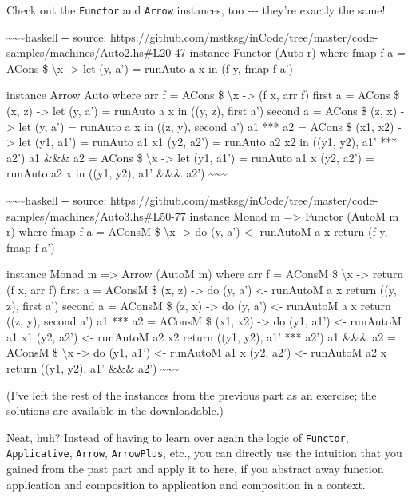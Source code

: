 \documentclass[]{article}
\begin{document}
Check out the \texttt{Functor} and \texttt{Arrow} instances, too -\/-\/- they're
exactly the same!

\textasciitilde{}\textasciitilde{}\textasciitilde{}haskell -\/- source:
https://github.com/mstksg/inCode/tree/master/code-samples/machines/Auto2.hs\#L20-47
instance Functor (Auto r) where fmap f a = ACons \$ \textbackslash{}x
-\textgreater{} let (y, a') = runAuto a x in (f y, fmap f a')

instance Arrow Auto where arr f = ACons \$ \textbackslash{}x -\textgreater{} (f
x, arr f) first a = ACons \$ (x, z) -\textgreater{} let (y, a') = runAuto a x in
((y, z), first a') second a = ACons \$ (z, x) -\textgreater{} let (y, a') =
runAuto a x in ((z, y), second a') a1 *** a2 = ACons \$ (x1, x2) -\textgreater{}
let (y1, a1') = runAuto a1 x1 (y2, a2') = runAuto a2 x2 in ((y1, y2), a1' ***
a2') a1 \&\&\& a2 = ACons \$ \textbackslash{}x -\textgreater{} let (y1, a1') =
runAuto a1 x (y2, a2') = runAuto a2 x in ((y1, y2), a1' \&\&\& a2')
\textasciitilde{}\textasciitilde{}\textasciitilde{}

\textasciitilde{}\textasciitilde{}\textasciitilde{}haskell -\/- source:
https://github.com/mstksg/inCode/tree/master/code-samples/machines/Auto3.hs\#L50-77
instance Monad m =\textgreater{} Functor (AutoM m r) where fmap f a = AConsM \$
\textbackslash{}x -\textgreater{} do (y, a') \textless{}- runAutoM a x return (f
y, fmap f a')

instance Monad m =\textgreater{} Arrow (AutoM m) where arr f = AConsM \$
\textbackslash{}x -\textgreater{} return (f x, arr f) first a = AConsM \$ (x, z)
-\textgreater{} do (y, a') \textless{}- runAutoM a x return ((y, z), first a')
second a = AConsM \$ (z, x) -\textgreater{} do (y, a') \textless{}- runAutoM a x
return ((z, y), second a') a1 *** a2 = AConsM \$ (x1, x2) -\textgreater{} do
(y1, a1') \textless{}- runAutoM a1 x1 (y2, a2') \textless{}- runAutoM a2 x2
return ((y1, y2), a1' *** a2') a1 \&\&\& a2 = AConsM \$ \textbackslash{}x
-\textgreater{} do (y1, a1') \textless{}- runAutoM a1 x (y2, a2') \textless{}-
runAutoM a2 x return ((y1, y2), a1' \&\&\& a2')
\textasciitilde{}\textasciitilde{}\textasciitilde{}

(I've left the rest of the instances from the previous part as an exercise; the
solutions are available in the downloadable.)

Neat, huh? Instead of having to learn over again the logic of \texttt{Functor},
\texttt{Applicative}, \texttt{Arrow}, \texttt{ArrowPlus}, etc., you can directly
use the intuition that you gained from the past part and apply it to here, if
you abstract away function application and composition to application and
composition in a context.
\end{document}
